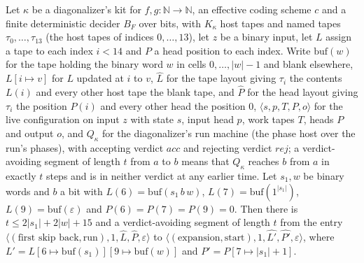 \begin{theorem}
\label{Turing.NTimeDiag.dz_split}
\leanok
{}
Let $\kappa$ be a diagonalizer's kit for $f, g : \mathbb{N} \to \mathbb{N}$, an effective coding scheme $c$ and a finite deterministic decider $B_F$ over bits, with $K_\kappa$ host tapes and named tapes $\tau_0, \dots, \tau_{13}$ (the host tapes of indices $0, \dots, 13$), let $z$ be a binary input, let $L$ assign a tape to each index $i < 14$ and $P$ a head position to each index. Write $\mathrm{buf}(w)$ for the tape holding the binary word $w$ in cells $0, \dots, |w| - 1$ and blank elsewhere, $L[i \mapsto v]$ for $L$ updated at $i$ to $v$, $\hat L$ for the tape layout giving $\tau_i$ the contents $L(i)$ and every other host tape the blank tape, and $\hat P$ for the head layout giving $\tau_i$ the position $P(i)$ and every other head the position $0$, $\langle s, p, T, P, o\rangle$ for the live configuration on input $z$ with state $s$, input head $p$, work tapes $T$, heads $P$ and output $o$, and $Q_\kappa$ for the diagonalizer's run machine (the phase host over the run's phases), with accepting verdict $\mathit{acc}$ and rejecting verdict $\mathit{rej}$; a verdict-avoiding segment of length $t$ from $a$ to $b$ means that $Q_\kappa$ reaches $b$ from $a$ in exactly $t$ steps and is in neither verdict at any earlier time. Let $s_1, w$ be binary words and $b$ a bit with $L(6) = \mathrm{buf}(s_1\,b\,w)$, $L(7) = \mathrm{buf}(1^{|s_1|})$, $L(9) = \mathrm{buf}(\varepsilon)$ and $P(6) = P(7) = P(9) = 0$. Then there is $t \le 2|s_1| + 2|w| + 15$ and a verdict-avoiding segment of length $t$ from the entry $\langle (\text{first skip back}, \text{run}), 1, \hat L, \hat P, \varepsilon\rangle$ to $\langle (\text{expansion}, \text{start}), 1, \hat{L'}, \hat{P'}, \varepsilon\rangle$, where $L' = L[6 \mapsto \mathrm{buf}(s_1)][9 \mapsto \mathrm{buf}(w)]$ and $P' = P[7 \mapsto |s_1| + 1]$.
\end{theorem}

